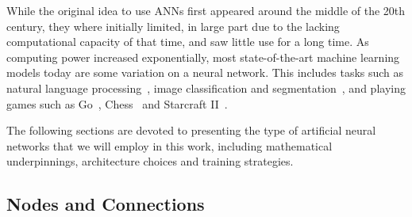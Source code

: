 \documentclass[Thesis.tex]{subfiles}
\begin{document}
While the original idea to use ANNs first appeared around the middle of the 20th
century, they where initially limited, in large part due to the lacking
computational capacity of that time, and saw little use for a long time. As
computing power increased exponentially, most state-of-the-art
machine learning models today are some variation on a neural network. This
includes tasks such as natural language processing~\cite{bert-2018}, image classification and
segmentation~\cite{gpipe-2018}, and playing games such as Go~\cite{deepmind-alpha-go-zero},
Chess~\cite{deepmind-alpha-zero} and Starcraft II~\cite{vinyals_babuschkin_chung_mathieu_2019}.

The following sections are devoted to presenting the type of artificial neural
networks that we will employ in this work, including mathematical underpinnings,
architecture choices and training strategies.

\subsection{Nodes and Connections}
\end{document}
